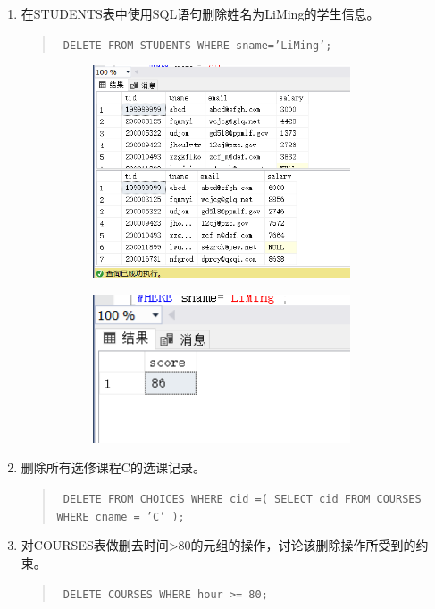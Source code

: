 \documentclass[a4paper,twoside]{article}
\begin{document}
\begin{spacing}{1.2}
\begin{enumerate}
  \item 在STUDENTS表中使用SQL语句删除姓名为LiMing的学生信息。
  \begin{quote}
    \texttt{
      DELETE FROM STUDENTS
WHERE sname='LiMing';\\
    }
  \end{quote}


  \begin{figure}[htb]
    \centering
    \begin{subfigure}{0.4\textwidth}
      \centering
      \includegraphics[width=0.9\textwidth]{5.png}
    \end{subfigure}
    \begin{subfigure}{0.4\textwidth}
      \centering
      \includegraphics[width=0.9\textwidth]{6.png}
    \end{subfigure}
  \end{figure}
  

  \item 删除所有选修课程C的选课记录。
  \begin{quote}
    \texttt{
DELETE FROM CHOICES
WHERE cid =(
    SELECT cid
    FROM COURSES
    WHERE cname = 'C'
    );\\
    }
  \end{quote}
  \item 对COURSES表做删去时间>80的元组的操作，讨论该删除操作所受到的约束。  
  \begin{quote}
    \texttt{
      DELETE COURSES WHERE hour >= 80;\\
    }
  \end{quote}


\end{enumerate}
\end{spacing}
\end{document}
